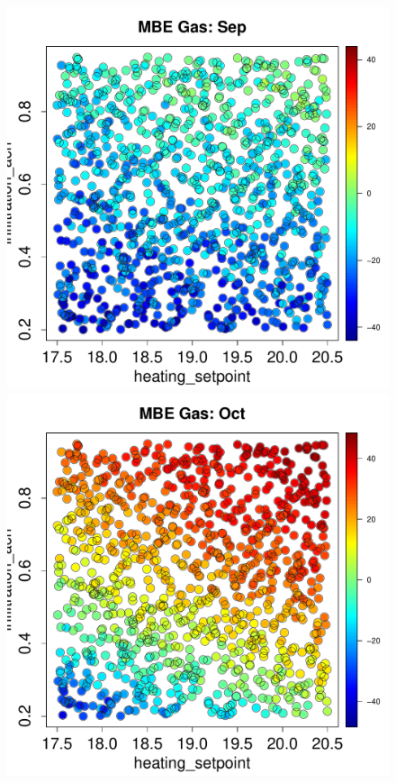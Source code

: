 \documentclass[a4paper, 12pt]{article}
\begin{document}
\begin{figure}
 \includegraphics[width=\scale]{MBE/MBE_Gas_09.pdf}\\
 \includegraphics[width=\scale]{MBE/MBE_Gas_10.pdf}

\end{figure}
\end{document}
